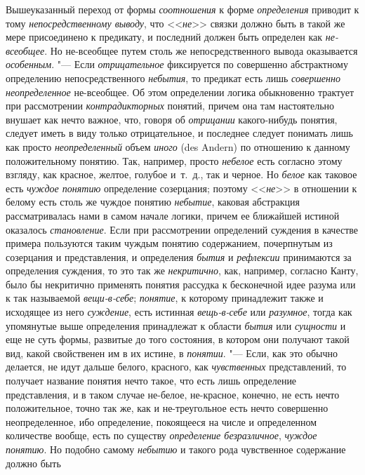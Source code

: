 {Вышеуказанный переход от формы
{\em соотношения} к форме
{\em определения}
приводит к тому
{\em непосредственному выводу},
что <<{\em не}>>
связки должно быть в такой же мере присоединено к предикату,
и последний должен быть определен как
{\em не-всеобщее}. Но
не-всеобщее путем столь же непосредственного вывода оказывается
{\em особенным}. "--- Если
{\em отрицательное}
фиксируется по совершенно абстрактному определению
непосредственного {\em небытия},
то предикат есть лишь
{\em совершенно неопределенное}
не-всеобщее. Об этом определении логика обыкновенно трактует
при рассмотрении {\em контрадикторных}
понятий, причем она там настоятельно внушает как нечто
важное, что, говоря об {\em отрицании}
какого-нибудь понятия, следует иметь в виду только
отрицательное, и последнее следует понимать лишь как просто
{\em неопределенный}
объем {\em иного} (des
Andern) по отношению к данному положительному понятию. Так,
например, просто {\em небелое}
есть согласно этому взгляду, как красное, желтое, голубое
и~т.~д., так и черное. Но {\em белое}
как таковое есть
{\em чуждое понятию}
определение созерцания; поэтому
<<{\em не}>> в отношении к
белому есть столь же чуждое понятию
{\em небытие}, каковая
абстракция рассматривалась нами в самом начале логики, причем ее ближайшей
истиной оказалось {\em становление}.
Если при рассмотрении определений суждения в
качестве примера пользуются таким чуждым понятию
содержанием, почерпнутым из созерцания и представления, и определения
{\em бытия} и
{\em рефлексии}
принимаются за определения суждения, то это так же
{\em некритично}, как,
например, согласно Канту, было бы некритично применять понятия рассудка к
бесконечной идее разума или к так называемой
{\em вещи-в-себе};
{\em понятие}, к которому
принадлежит также и исходящее из него
{\em суждение}, есть
истинная {\em вещь-в-себе}
или {\em разумное},
тогда как упомянутые выше определения принадлежат к области
{\em бытия} или
{\em сущности} и еще не
суть формы, развитые до того состояния, в котором они получают такой вид,
какой свойственен им в их истине, в
{\em понятии}. "--- Если,
как это обычно делается, не идут дальше белого, красного, как
{\em чувственных}
представлений, то получает название понятия нечто такое, что
есть лишь определение представления, и в таком случае не-белое, не-красное,
конечно, не есть нечто положительное, точно так же, как и не-треугольное
есть нечто совершенно неопределенное, ибо определение, покоящееся на числе
и определенном количестве вообще, есть по существу
{\em определение безразличное},
{\em чуждое понятию}. Но
подобно самому {\em небытию}
и такого рода чувственное содержание должно быть
}
